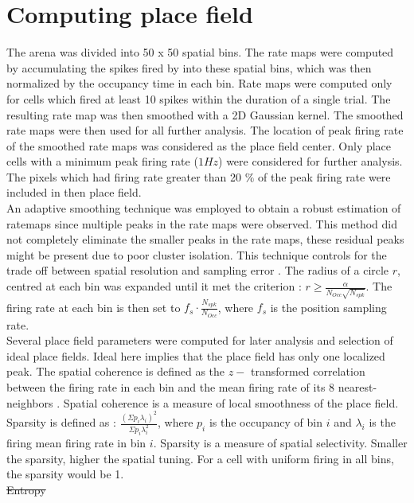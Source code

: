 \section{Computing place field}
\label{pfcompute}
The arena was divided into 50 x 50 spatial bins. The rate maps were computed by accumulating the spikes fired by into these spatial bins, which was then normalized by the occupancy time in each bin.
Rate maps were computed only for cells which fired at least 10 spikes within the duration of a single trial. The resulting rate map was then smoothed with a 2D Gaussian kernel. The smoothed rate maps were then used for all further analysis. The location of peak firing rate of the smoothed rate maps was considered as the place field center. Only place cells with a minimum peak firing rate ($1Hz$) were considered for further analysis. The pixels which had firing rate greater than 20 $\%$ of the peak firing rate were included in then place field.\\ 
An adaptive smoothing technique was employed to obtain a robust estimation of ratemaps since multiple peaks in the rate maps were observed. This method did not completely eliminate the smaller peaks in the rate maps, these residual peaks might be present due to poor cluster isolation. This technique controls for the trade off between spatial resolution and sampling error \cite{Skaggs1996c}. The radius of a circle $r$, centred at each bin was expanded until it met the criterion :   $ r \geq \frac{\alpha}{N_{Occ} \sqrt{N_{spk}}}$. The firing rate at each bin is then set to $f_{s} \cdot \frac{N_{spk}}{N_{Occ}}$, where $f_{s}$ is the position sampling rate.\\
Several place field parameters were computed for later analysis and selection of ideal place fields. Ideal here implies that the place field has only one localized peak. The spatial coherence is defined as the $z-$ transformed correlation between the firing rate in each bin and the mean firing rate of its 8 nearest-neighbors \cite{Muller1989}. Spatial coherence is a measure of local smoothness of the place field.\\
Sparsity is defined as : $\frac{(\Sigma p_{i} \lambda_{i})^{2}}{\Sigma p_{i} \lambda^{2}_{i}}$, where $p_{i}$ is the occupancy of bin $i$ and $\lambda_{i}$ is the firing mean firing rate in bin $i$. Sparsity is a measure of spatial selectivity. Smaller the sparsity, higher the spatial tuning. For a cell with uniform firing in all bins, the sparsity would be 1. \\
\st{Entropy} \\

